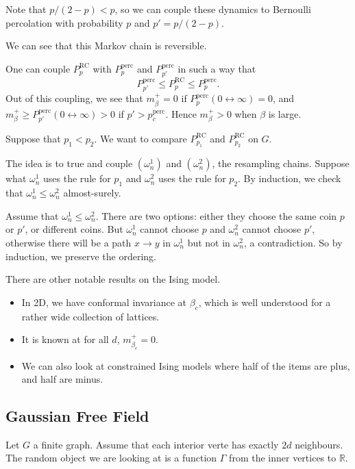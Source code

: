\documentclass[12pt]{article}
\begin{document}
Note that $p/(2 - p) < p$, so we can couple these dynamics to Bernoulli percolation with probability $p$ and $p' = p/(2 - p)$.


We can see that this Markov chain is reversible.

One can couple $P_p^{\mathrm{RC}}$ with $P_p^{\mathrm{perc}}$ and $P_{p'}^{\mathrm{perc}}$ in such a way that
\[
P_{p'}^{\mathrm{perc}} \leq P_p^{\mathrm{RC}} \leq P_p^{\mathrm{perc}}.
\]
Out of this coupling, we see that $m_\beta^{+}= 0$ if $P_p^{\mathrm{perc}}(0 \leftrightarrow \infty) = 0$, and $m_\beta^{+} \geq P_{p'}^{\mathrm{perc}}(0 \leftrightarrow \infty) > 0$ if $p' > p_c^{\mathrm{perc}}$. Hence $m_\beta^{+} > 0$ when $\beta$ is large.

Suppose that $p_1 < p_2$. We want to compare $P_{p_1}^{\mathrm{RC}}$ and $P_{p_2}^{\mathrm{RC}}$ on $G$.

The idea is to true and couple $(\omega_n^1)$ and $(\omega_n^{2})$, the resampling chains. Suppose what $\omega_n^{1}$ uses the rule for $p_1$ and $\omega_n^{2}$ uses the rule for $p_2$. By induction, we check that $\omega_n^{1} \leq \omega_n^{2}$ almost-surely.

Assume that $\omega_n^{1} \leq \omega_n^{2}$. There are two options: either they choose the same coin $p$ or $p'$, or different coins. But $\omega_n^{1}$ cannot choose $p$ and $\omega_n^{2}$ cannot choose $p'$, otherwise there will be a path $x \to y$ in $\omega_n^{1}$ but not in $\omega_n^{2}$, a contradiction. So by induction, we preserve the ordering.

There are other notable results on the Ising model.
\begin{itemize}
	\item In 2D, we have conformal invariance at $\beta_c$, which is well understood for a rather wide collection of lattices.
	\item It is known at for all $d$, $m_{\beta_c}^{+} = 0$.
	\item We can also look at constrained Ising models where half of the items are plus, and half are minus.
\end{itemize}

\newpage

\subsection{Gaussian Free Field}%
\label{sub:gff}

Let $G$ a finite graph. Assume that each interior verte has exactly $2d$ neighbours. The random object we are looking at is a function $\Gamma$ from the inner vertices to $\mathbb{R}$.
\end{document}
